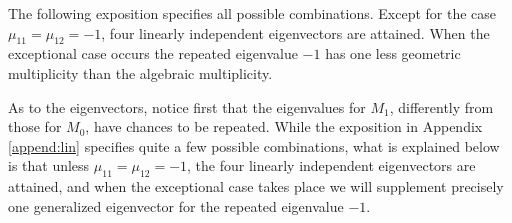 \documentclass[a4paper,11pt]{article}
\def\blue{\color{blue}}
\theoremstyle{remark}
\begin{document}

The following exposition specifies all possible {\blue combinations. Except for the case $\mu_{11}=\mu_{12}=-1$,} four linearly independent eigenvectors are attained. 
When the exceptional case occurs the repeated eigenvalue $-1$ has one less geometric multiplicity than the algebraic multiplicity.%

As to the eigenvectors, notice first that the eigenvalues for $M_1$, differently from those for $M_0$, have chances to be repeated. While the exposition in
Appendix \ref{append:lin} specifies quite a few possible combinations, 
what is explained below is that unless $\mu_{11}=\mu_{12}=-1$, the four linearly independent eigenvectors are attained, and when the exceptional case takes place we will supplement precisely one generalized eigenvector for the repeated eigenvalue $-1$.
\end{document}
